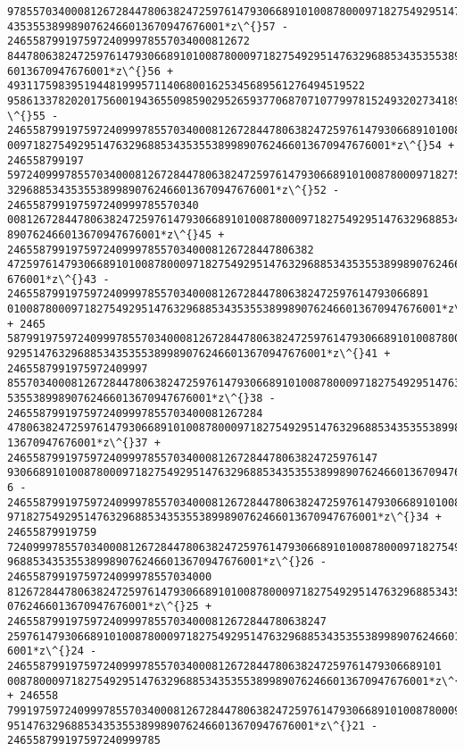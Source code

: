 \documentclass[11pt]{article}
\begin{document}
\begin{tcolorbox}[breakable, size=fbox, boxrule=.5pt, pad at break*=1mm, opacityfill=0]
\begin{Verbatim}[commandchars=\\\{\}]
97855703400081267284478063824725976147930668910100878000971827549295147632968853
4353553899890762466013670947676001*z\^{}57 - 24655879919759724099978557034000812672
84478063824725976147930668910100878000971827549295147632968853435355389989076246
6013670947676001*z\^{}56 + 49311759839519448199957114068001625345689561276494519522
958613378202017560019436550985902952659377068707107799781524932027341895352002*z
\^{}55 - 24655879919759724099978557034000812672844780638247259761479306689101008780
009718275492951476329688534353553899890762466013670947676001*z\^{}54 + 246558799197
59724099978557034000812672844780638247259761479306689101008780009718275492951476
329688534353553899890762466013670947676001*z\^{}52 - 246558799197597240999785570340
00812672844780638247259761479306689101008780009718275492951476329688534353553899
890762466013670947676001*z\^{}45 + 246558799197597240999785570340008126728447806382
47259761479306689101008780009718275492951476329688534353553899890762466013670947
676001*z\^{}43 - 246558799197597240999785570340008126728447806382472597614793066891
01008780009718275492951476329688534353553899890762466013670947676001*z\^{}42 + 2465
58799197597240999785570340008126728447806382472597614793066891010087800097182754
92951476329688534353553899890762466013670947676001*z\^{}41 + 2465587991975972409997
85570340008126728447806382472597614793066891010087800097182754929514763296885343
53553899890762466013670947676001*z\^{}38 - 2465587991975972409997855703400081267284
47806382472597614793066891010087800097182754929514763296885343535538998907624660
13670947676001*z\^{}37 + 2465587991975972409997855703400081267284478063824725976147
9306689101008780009718275492951476329688534353553899890762466013670947676001*z\^{}3
6 - 2465587991975972409997855703400081267284478063824725976147930668910100878000
9718275492951476329688534353553899890762466013670947676001*z\^{}34 + 24655879919759
72409997855703400081267284478063824725976147930668910100878000971827549295147632
9688534353553899890762466013670947676001*z\^{}26 - 24655879919759724099978557034000
81267284478063824725976147930668910100878000971827549295147632968853435355389989
0762466013670947676001*z\^{}25 + 24655879919759724099978557034000812672844780638247
25976147930668910100878000971827549295147632968853435355389989076246601367094767
6001*z\^{}24 - 24655879919759724099978557034000812672844780638247259761479306689101
008780009718275492951476329688534353553899890762466013670947676001*z\^{}22 + 246558
79919759724099978557034000812672844780638247259761479306689101008780009718275492
951476329688534353553899890762466013670947676001*z\^{}21 - 246558799197597240999785

\end{Verbatim}
\end{tcolorbox}
\end{document}
